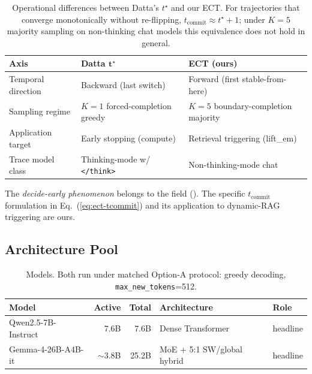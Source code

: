 \documentclass[11pt]{article}
\begin{document}
\begin{table}[h]
\centering\small
\begin{tabular}{@{}lll@{}}
\toprule
\textbf{Axis} & \textbf{Datta} $\boldsymbol{t^\star}$ & \textbf{ECT (ours)} \\
\midrule
Temporal direction & Backward (last switch) & Forward (first stable-from-here) \\
Sampling regime & $K{=}1$ forced-completion greedy & $K{=}5$ boundary-completion majority \\
Application target & Early stopping (compute) & Retrieval triggering (lift\_em) \\
Trace model class & Thinking-mode w/ \texttt{</think>} & Non-thinking-mode chat \\
\bottomrule
\end{tabular}
\caption{Operational differences between Datta's $t^\star$ and our ECT.
For trajectories that converge monotonically without re-flipping,
$t_{\text{commit}} \approx t^\star + 1$; under $K{=}5$ majority sampling on
non-thinking chat models this equivalence does not hold in general.}
\label{tab:ect-vs-tstar}
\end{table}

The \emph{decide-early phenomenon} belongs to the field
(\citealp{Datta_DecideEarlyExplainLater, Wang_ChainOfProbeCoTStepByStep,
Chen_DynamicInstabilityLLMReasoning}). The specific $t_{\text{commit}}$
formulation in Eq.~(\ref{eq:ect-tcommit}) and its application to
dynamic-RAG triggering are ours.


\subsection{Architecture Pool}
\label{sec:methods-archs}

\begin{table}[h]
\centering\small
\begin{tabular}{@{}lrrll@{}}
\toprule
\textbf{Model} & \textbf{Active} & \textbf{Total} &
\textbf{Architecture} & \textbf{Role} \\
\midrule
Qwen2.5-7B-Instruct & 7.6B & 7.6B & Dense Transformer & headline \\
Gemma-4-26B-A4B-it & $\sim$3.8B & 25.2B & MoE + 5:1 SW/global hybrid & headline \\
\bottomrule
\end{tabular}
\caption{Models. Both run under matched Option-A protocol: greedy decoding,
\texttt{max\_new\_tokens}=512.}
\label{tab:archs}
\end{table}
\end{document}
